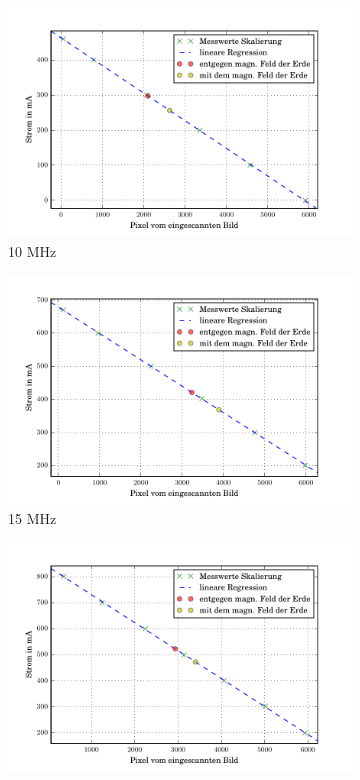 \begin{figure}
  \centering
  \begin{subfigure}[b]{0.49\textwidth}
     \includegraphics[width=\textwidth]{picture/10MHz.pdf}
     \caption{10 MHz}
     \label{fig:10Reg}
  \end{subfigure}
  \begin{subfigure}[b]{0.49\textwidth}
     \includegraphics[width=\textwidth]{picture/15MHz.pdf}
     \caption{15 MHz}
     \label{fig:15Reg}
  \end{subfigure}
  \begin{subfigure}[b]{0.49\textwidth}
     \includegraphics[width=\textwidth]{picture/20MHz.pdf}

\end{subfigure}
\end{figure}

